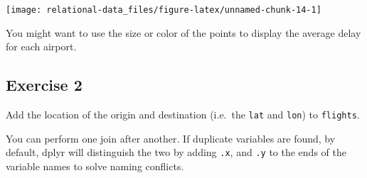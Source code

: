 \documentclass[]{book}
\newenvironment{Shaded}{\begin{snugshade}}{\end{snugshade}}
\newcommand{\CommentTok}[1]{\textcolor[rgb]{0.56,0.35,0.01}{\textit{#1}}}
\newcommand{\DataTypeTok}[1]{\textcolor[rgb]{0.13,0.29,0.53}{#1}}
\newcommand{\KeywordTok}[1]{\textcolor[rgb]{0.13,0.29,0.53}{\textbf{#1}}}
\newcommand{\NormalTok}[1]{#1}
\newcommand{\OperatorTok}[1]{\textcolor[rgb]{0.81,0.36,0.00}{\textbf{#1}}}
\newcommand{\OtherTok}[1]{\textcolor[rgb]{0.56,0.35,0.01}{#1}}
\newcommand{\StringTok}[1]{\textcolor[rgb]{0.31,0.60,0.02}{#1}}
\theoremstyle{plain}
\theoremstyle{remark}
\theoremstyle{definition}
\theoremstyle{definition}
\theoremstyle{definition}
\theoremstyle{remark}
\begin{document}
\begin{Shaded}
\end{Shaded}

\begin{center}\texttt{[image: relational-data\_files/figure-latex/unnamed-chunk-14-1]} \end{center}

You might want to use the size or color of the points to display the
average delay for each airport.

\hypertarget{exercise-2-27}{%
\subsection{Exercise 2}\label{exercise-2-27}}

Add the location of the origin and destination (i.e.~the \texttt{lat}
and \texttt{lon}) to \texttt{flights}.

You can perform one join after another. If duplicate variables are
found, by default, dplyr will distinguish the two by adding \texttt{.x},
and \texttt{.y} to the ends of the variable names to solve naming
conflicts.
\end{document}
